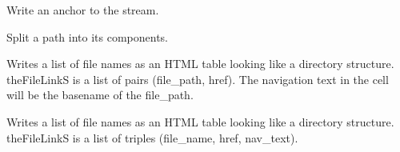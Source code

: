 \documentclass[letterpaper,10pt,english]{sphinxmanual}
\begin{document}
\begin{fulllineitems}
\label{\detokenize{ref/util/HtmlUtils:TotalDepth.util.HtmlUtils.writeHtmlFileAnchor}}
Write an anchor to the stream.

\end{fulllineitems}


\begin{fulllineitems}
\label{\detokenize{ref/util/HtmlUtils:TotalDepth.util.HtmlUtils.pathSplit}}
Split a path into its components.

\end{fulllineitems}


\begin{fulllineitems}
\label{\detokenize{ref/util/HtmlUtils:TotalDepth.util.HtmlUtils.writeFileListAsTable}}
Writes a list of file names as an HTML table looking like a directory
structure. theFileLinkS is a list of pairs (file\_path, href).
The navigation text in the cell will be the basename of the file\_path.

\end{fulllineitems}


\begin{fulllineitems}
\label{\detokenize{ref/util/HtmlUtils:TotalDepth.util.HtmlUtils.writeFileListTrippleAsTable}}
Writes a list of file names as an HTML table looking like a directory
structure. theFileLinkS is a list of triples (file\_name, href, nav\_text).

\end{fulllineitems}

\end{document}
